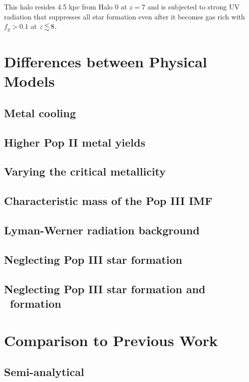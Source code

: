 \documentclass[useAMS,usenatbib]{mn2e}
\begin{document}
 This halo resides 4.5 kpc from Halo 0 at $z=7$ and is
subjected to strong UV radiation that suppresses all star formation
even after it becomes gas rich with $f_g > 0.1$ at $z \la 8$.

\section{Differences between Physical Models}
\label{sec:models}

\subsection{Metal cooling}

\subsection{Higher Pop II metal yields}

\subsection{Varying the critical metallicity}

\subsection{Characteristic mass of the Pop III IMF}

\subsection{Lyman-Werner radiation background}

\subsection{Neglecting Pop III star formation}

\subsection{Neglecting Pop III star formation and \hh~formation}

\section{Comparison to Previous Work}
\label{sec:compare}

\subsection{Semi-analytical}
\end{document}
